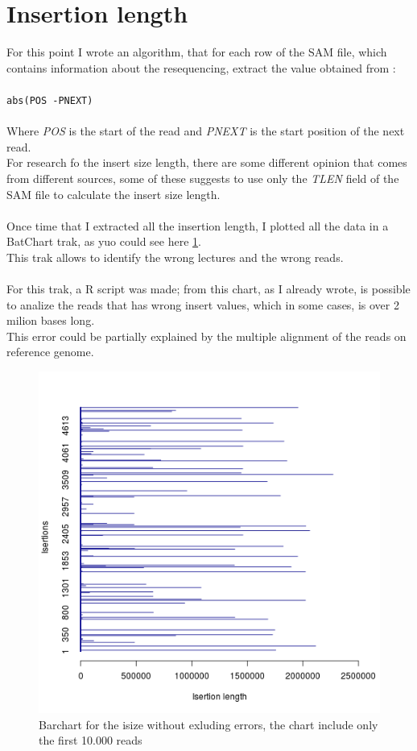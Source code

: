 \section{Insertion length}
For this point I wrote an algorithm, that for each row of the SAM file, which contains information about the resequencing, extract the value obtained from :
\\
\\
\verb|abs(POS -PNEXT)|
\\
\\
Where \emph{POS} is the start of the read and \emph{PNEXT} is the start position of the next read.\\
For research fo the insert size length, there are some different opinion that comes from different sources, some of these suggests to use only the \emph{TLEN} field of the SAM file to calculate the insert size length.
\\\\
Once time that I extracted all the insertion length, I plotted all the data in a BatChart trak, as yuo could see here \ref{fig:1}.\\
This trak allows to identify the wrong lectures and the wrong reads.
\\\\
For this trak, a R script was made; from this chart, as I already wrote, is possible to analize the reads that has wrong insert values, which in some cases, is over 2 milion bases long.\\

This error could be partially explained by the multiple alignment of the reads on reference genome.
\newpage
 \begin{figure}[H]
				\centering
				\includegraphics[scale=0.8]{immagini/r.png}
				\caption{Barchart for the isize without exluding errors, the chart include only the first 10.000 reads}\label{fig:1}
				\end{figure}

